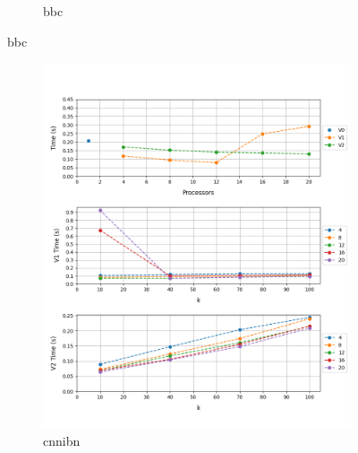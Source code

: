 \documentclass[12pt, a4paper]{article}
\begin{document}
\begin{figure}[h!]
\begin{subfigure}[b]{0.33\textwidth}
         \caption{bbc} 
     \end{subfigure}
\end{figure}


\begin{figure}[h!]
     \begin{subfigure}[b]{0.33\textwidth}
         \centering
         \includegraphics[height=.4\textheight, width=\textwidth, keepaspectratio]{assets/tv/cnnibn.png}
    \caption{cnnibn}
     \end{subfigure}
     \hfill
     \begin{subfigure}[b]{0.33\textwidth}
         \centering

\end{subfigure}
\end{figure}
\end{document}
